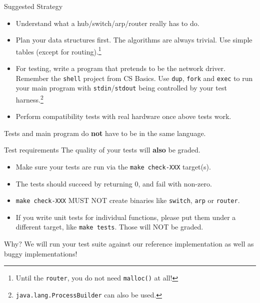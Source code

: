 \documentclass{beamer}
\begin{document}
\begin{frame}{Suggested Strategy}
\begin{itemize}
\item Understand what a hub/switch/arp/router really has to do.
\item Plan your data structures first. The algorithms are always trivial.
      Use simple tables (except for routing).\footnote{Until the {\tt router},
      you do not need {\tt malloc()} at all!}
\item For testing, write a program that pretends to be the network driver.
      Remember the {\tt shell} project from CS Basics. Use {\tt dup}, {\tt fork}
      and {\tt exec} to run your main program with {\tt stdin}/{\tt stdout}
      being controlled by your test harness.\footnote{{\tt java.lang.ProcessBuilder}
      can also be used.}
\item Perform compatibility tests with real hardware once above tests work.
\end{itemize}
Tests and main program do {\bf not} have to be in the same language.
\end{frame}


\begin{frame}{Test requirements}
  The quality of your tests will {\bf also} be graded.
  \begin{itemize}
  \item Make sure your tests are run via the {\tt make check-XXX} target(s).
  \item The tests should succeed by returning 0, and fail with non-zero.
  \item {\tt make check-XXX} MUST NOT create binaries like {\tt switch}, {\tt arp}
    or {\tt router}.
  \item If you write unit tests for individual functions, please put them
    under a different target, like {\tt make tests}.  Those will NOT be
    graded.
  \end{itemize}
  Why? We will run your test suite against our reference implementation
  as well as buggy implementations!
\end{frame}
\end{document}
